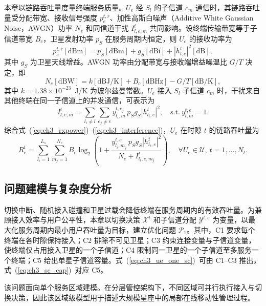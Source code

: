 本章以链路吞吐量度量终端服务质量。$U_e$ 经 $S_l$ 的子信道 $c_m$ 通信时，其链路吞吐量受分配带宽、接收信号强度 $p_e^{t,r}$、加性高斯白噪声（Additive White Gaussian Noise，AWGN）功率 $N_e$ 和同信道干扰 $I_{l,e,m}^t$ 共同影响。设终端传输带宽等于子信道带宽 $B_c$，卫星发射功率 $p_S$ 在服务周期内恒定，则 $U_e$ 的接收功率为
\begin{equation}\label{eq:ch3_rxpower}
p_e^{t,r}[\text{dBm}]=p_S[\text{dBm}]+g_S[\text{dBi}]+|h_{l,e}^t|^2[\text{dB}],
\end{equation}
其中 $g_S$ 为卫星天线增益。AWGN 功率由分配带宽与接收端增益噪温比 $G/T$ 决定，即
\begin{equation}\label{eq:ch3_awgn}
N_e[\text{dBW}]=k[\text{dBJ/K}]+B_c[\text{dBHz}]-G/T[\text{dB/K}],
\end{equation}
其中 $k=1.38\times10^{-23}$~J/K 为玻尔兹曼常数。$U_e$ 接入 $S_l$ 子信道 $c_m$ 时，干扰来自其他终端在同一子信道上的并发通信，可表示为
\begin{equation}\label{eq:ch3_interference}
I_{l,e,m}^t=\sum_{l_i\neq l}\sum_{e_j\neq e}y_{l_i,m}^{t,e_j}\,p_S g_S|h_{l_i,e}^t|^2,\quad\text{s.t.}~y_{l,m}^{t,e}=1.
\end{equation}
综合式~(\ref{eq:ch3_rxpower})--(\ref{eq:ch3_interference})，$U_e$ 在时隙 $t$ 的链路吞吐量为
\begin{equation}\label{eq:ch3_throughput}
R_e^t=\sum_{l_i=1}^{L_s}\sum_{m_j=1}^{N_c}B_c\log_2\!\left(1+\frac{y_{l_i,m_j}^{t,e}\,p_S g_S|h_{l_i,e}^t|^2}{N_e+I_{l_i,e,m_j}^t}\right),\quad\forall U_e\in\mathcal{U},~t=1,\dots,N_t.
\end{equation}

\subsection{问题建模与复杂度分析}
\label{subsec:ch3_problem}

切换中断、随机接入碰撞和卫星过载会降低终端在服务周期内的有效吞吐量。为兼顾接入效率与用户公平性，本章以切换决策 $\mathcal{X}^t$ 和子信道分配 $\mathcal{Y}^{t,e}$ 为变量，以最大化服务周期内最小用户吞吐量为目标，建立优化问题 $\mathcal{P}_1$。其中，C1 要求每个终端在各时隙保持接入；C2 排除不可见卫星；C3 约束连接变量与子信道变量，使终端仅占用接入卫星的一个子信道；C4 限制同一卫星的一个子信道至多服务一个终端；C5 给出单星子信道容量。式~(\ref{eq:ch3_ue_one_sc})~可由 C1--C3 推出，式~(\ref{eq:ch3_sc_cap})~对应 C5。

该问题面向单个服务区域建模。在分层管控架构下，不同区域可并行执行接入与切换决策，因此该区域级模型用于描述大规模星座中的局部在线移动性管理过程。

